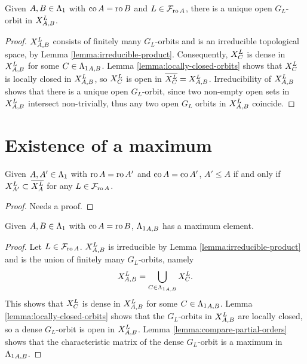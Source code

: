 \documentclass[a4paper, 11pt]{report}
\begin{document}
\begin{proposition}\label{prop:open-orbits-in-product}
Given $A,B\in\matrices$ with $\co{A}=\ro{B}$ and $L\in\flags_{\ro{A}}$, there is a unique open $G_L$-orbit in $\xprod[L]{A,B}$.
\end{proposition}

\begin{proof}
$\xprod[L]{A,B}$ consists of finitely many $G_L$-orbits and is an irreducible topological space, by Lemma \ref{lemma:irreducible-product}. Consequently, $\xprod[L]{C}$ is dense in $\xprod[L]{A,B}$ for some $C\in\matrices_{A,B}$. Lemma \ref{lemma:locally-closed-orbits} shows that $\xprod[L]{C}$ is locally closed in $\xprod[L]{A,B}$, so $\xprod[L]{C}$ is open in $\overline{\xprod[L]{C}}=\xprod[L]{A,B}$. Irreducibility of $\xprod[L]{A,B}$ shows that there is a unique open $G_L$-orbit, since two non-empty open sets in $\xprod[L]{A,B}$ intersect non-trivially, thus any two open $G_L$ orbits in $\xprod[L]{A,B}$ coincide.
\end{proof}

\section{Existence of a maximum}

\begin{lemma}\label{lemma:compare-partial-orders}
Given $A,A'\in\matrices$ with $\ro{A}=\ro{A'}$ and $\co{A}=\co{A'}$, $A'\le A$ if and only if $\xprod[L]{A'}\subset\overline{\xprod[L]{A}}$ for any $L\in\flags_{\ro{A}}$.
\end{lemma}

{\color{blue}
\begin{proof}
Needs a proof.
\end{proof}
}

\begin{proposition}\label{proposition:existence}
Given $A,B\in\matrices$ with $\co{A}=\ro{B}$, $\matrices_{A,B}$ has a maximum element.
\end{proposition}

\begin{proof}
Let $L\in\flags_{\ro{A}}$. $\xprod[L]{A,B}$ is irreducible by Lemma \ref{lemma:irreducible-product} and is the union of finitely many $G_L$-orbits, namely
\begin{equation*}
\xprod[L]{A,B} = \bigcup_{C\in\matrices_{A,B}} \xprod[L]{C}.
\end{equation*}
This shows that $\xprod[L]{C}$ is dense in $\xprod[L]{A,B}$ for some $C\in\matrices_{A,B}$. Lemma \ref{lemma:locally-closed-orbits} shows that the $G_L$-orbits in $\xprod[L]{A,B}$ are locally closed, so a dense $G_L$-orbit is open in $\xprod[L]{A,B}$. Lemma \ref{lemma:compare-partial-orders} shows that the characteristic matrix of the dense $G_L$-orbit is a maximum in $\matrices_{A,B}$.
\end{proof}
\end{document}
